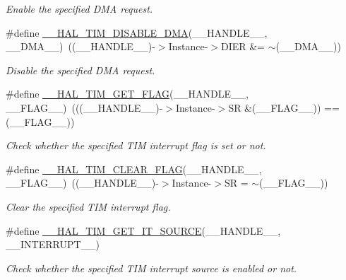 \begin{DoxyCompactItemize}
\begin{DoxyCompactList}\small\item\em Enable the specified D\+MA request. \end{DoxyCompactList}\item 
\#define \hyperlink{group___t_i_m___exported___macros_ga1a6e8b19efd23fd0295802d904c4702f}{\+\_\+\+\_\+\+H\+A\+L\+\_\+\+T\+I\+M\+\_\+\+D\+I\+S\+A\+B\+L\+E\+\_\+\+D\+MA}(\+\_\+\+\_\+\+H\+A\+N\+D\+L\+E\+\_\+\+\_\+,  \+\_\+\+\_\+\+D\+M\+A\+\_\+\+\_\+)~((\+\_\+\+\_\+\+H\+A\+N\+D\+L\+E\+\_\+\+\_\+)-\/$>$Instance-\/$>$D\+I\+ER \&= $\sim$(\+\_\+\+\_\+\+D\+M\+A\+\_\+\+\_\+))
\begin{DoxyCompactList}\small\item\em Disable the specified D\+MA request. \end{DoxyCompactList}\item 
\#define \hyperlink{group___t_i_m___exported___macros_ga96d98c66ad9d85f00c148de99888ef19}{\+\_\+\+\_\+\+H\+A\+L\+\_\+\+T\+I\+M\+\_\+\+G\+E\+T\+\_\+\+F\+L\+AG}(\+\_\+\+\_\+\+H\+A\+N\+D\+L\+E\+\_\+\+\_\+,  \+\_\+\+\_\+\+F\+L\+A\+G\+\_\+\+\_\+)~(((\+\_\+\+\_\+\+H\+A\+N\+D\+L\+E\+\_\+\+\_\+)-\/$>$Instance-\/$>$SR \&(\+\_\+\+\_\+\+F\+L\+A\+G\+\_\+\+\_\+)) == (\+\_\+\+\_\+\+F\+L\+A\+G\+\_\+\+\_\+))
\begin{DoxyCompactList}\small\item\em Check whether the specified T\+IM interrupt flag is set or not. \end{DoxyCompactList}\item 
\#define \hyperlink{group___t_i_m___exported___macros_ga2fe74db6b8cb4badd04ed48e0f5ac7b4}{\+\_\+\+\_\+\+H\+A\+L\+\_\+\+T\+I\+M\+\_\+\+C\+L\+E\+A\+R\+\_\+\+F\+L\+AG}(\+\_\+\+\_\+\+H\+A\+N\+D\+L\+E\+\_\+\+\_\+,  \+\_\+\+\_\+\+F\+L\+A\+G\+\_\+\+\_\+)~((\+\_\+\+\_\+\+H\+A\+N\+D\+L\+E\+\_\+\+\_\+)-\/$>$Instance-\/$>$SR = $\sim$(\+\_\+\+\_\+\+F\+L\+A\+G\+\_\+\+\_\+))
\begin{DoxyCompactList}\small\item\em Clear the specified T\+IM interrupt flag. \end{DoxyCompactList}\item 
\#define \hyperlink{group___t_i_m___exported___macros_ga644babf93470a6eee6bce8906c4da5c5}{\+\_\+\+\_\+\+H\+A\+L\+\_\+\+T\+I\+M\+\_\+\+G\+E\+T\+\_\+\+I\+T\+\_\+\+S\+O\+U\+R\+CE}(\+\_\+\+\_\+\+H\+A\+N\+D\+L\+E\+\_\+\+\_\+,  \+\_\+\+\_\+\+I\+N\+T\+E\+R\+R\+U\+P\+T\+\_\+\+\_\+)
\begin{DoxyCompactList}\small\item\em Check whether the specified T\+IM interrupt source is enabled or not. \end{DoxyCompactList}\item 

\end{DoxyCompactItemize}
